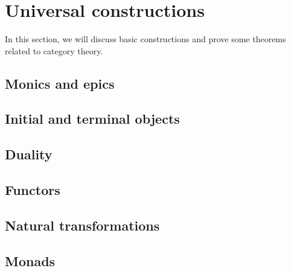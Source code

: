 \documentclass[../thesis.tex]{subfiles}
\begin{document}
\chapter{Universal constructions}

In this section, we will discuss basic constructions and prove some theorems related to category theory.

\section{Monics and epics}

\section{Initial and terminal objects}

\section{Duality}

\section{Functors}

\section{Natural transformations}

\section{Monads}
\end{document}
